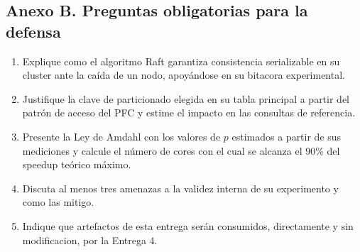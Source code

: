 \documentclass[11pt,a4paper]{article}
\begin{document}
\subsection*{Anexo B. Preguntas obligatorias para la defensa}

    \begin{enumerate}
        \item Explique como el algoritmo Raft garantiza consistencia serializable en su cluster ante la caída de un nodo, apoyándose en su bitacora experimental.
        \item Justifique la clave de particionado elegida en su tabla principal a partir del patrón de acceso del PFC y estime el impacto en las consultas de referencia.
        \item Presente la Ley de Amdahl con los valores de $p$ estimados a partir de sus mediciones y calcule el número de cores con el cual se alcanza el 90\% del speedup teórico máximo.
        \item Discuta al menos tres amenazas a la validez interna de su experimento y como las mitigo.
        \item Indique que artefactos de esta entrega serán consumidos, directamente y sin modificacion, por la Entrega 4.
    \end{enumerate}



\end{document}
